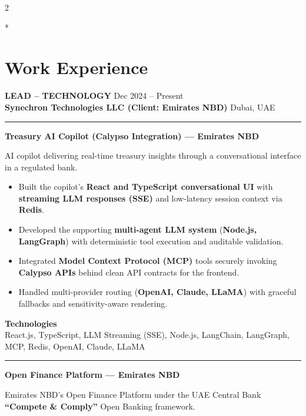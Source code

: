 \documentclass[10pt,a4paper]{article}
\newcommand{\blockdivider}{\vspace{0pt}\color{rulecolor}\rule{\linewidth}{0.5pt}\color{primary}\vspace{4pt}}
\newcommand{\roleheader}[4]{%
  \noindent
  \textbf{\MakeUppercase{#3}}%
  \hfill
  \textcolor{secondary}{#4}\\[0pt]

  \noindent
  \textbf{#1}%
  \hfill
  \textcolor{secondary}{#2}\\[0pt]
}
\newcommand{\roledivider}{%
  \vspace{-1pt}%
  {\color{rulecolor}\rule{\linewidth}{0.5pt}}%
  \vspace{2pt}%
}
\newcommand{\projecttitle}[1]{\textbf{#1}\par\vspace{2pt}}
\begin{document}
\begin{paracol}{2}

\switchcolumn[0]*
\section*{Work Experience}

\roleheader{Synechron Technologies LLC (Client: Emirates NBD)}{Dubai, UAE}{Lead -- Technology}{Dec 2024 -- Present}
\roledivider

\projecttitle{Treasury AI Copilot (Calypso Integration) — Emirates NBD}

AI copilot delivering real-time treasury insights through a conversational interface in a regulated bank.

\begin{itemize}

\item Built the copilot's \textbf{React and TypeScript conversational UI} with \textbf{streaming LLM responses (SSE)} and low-latency session context via \textbf{Redis}.

\item Developed the supporting \textbf{multi-agent LLM system} (\textbf{Node.js, LangGraph}) with deterministic tool execution and auditable validation.

\item Integrated \textbf{Model Context Protocol (MCP)} tools securely invoking \textbf{Calypso APIs} behind clean API contracts for the frontend.

\item Handled multi-provider routing (\textbf{OpenAI, Claude, LLaMA}) with graceful fallbacks and sensitivity-aware rendering.

\end{itemize}

\textbf{Technologies}\\
React.js, TypeScript, LLM Streaming (SSE), Node.js, LangChain, LangGraph, MCP, Redis, OpenAI, Claude, LLaMA

\blockdivider

\projecttitle{Open Finance Platform — Emirates NBD}

Emirates NBD's Open Finance Platform under the UAE Central Bank \textbf{``Compete \& Comply''} Open Banking framework.


\end{paracol}
\end{document}

